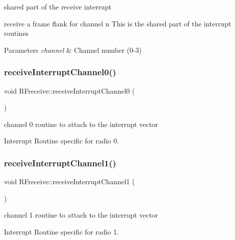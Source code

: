 shared part of the receive interrupt 

receive a frame flank for channel n This is the shared part of the interrupt routines 
\begin{DoxyParams}{Parameters}
{\em channel} & Channel number (0-\/3) \\
\hline
\end{DoxyParams}
\mbox{\label{class_r_freceive_a1f1c4ecbbafe17d4bebe3faedd9a6450}} 
\subsubsection{\texorpdfstring{receive\+Interrupt\+Channel0()}{receiveInterruptChannel0()}}
{\footnotesize\ttfamily void R\+Freceive\+::receive\+Interrupt\+Channel0 (\begin{DoxyParamCaption}{ }\end{DoxyParamCaption})\hspace{0.3cm}{\ttfamily [static]}}



channel 0 routine to attach to the interrupt vector 

Interrupt Routine specific for radio 0. \mbox{\label{class_r_freceive_aeb586b7bb9cb2c30ea4fa2b70e4e4a61}} 
\subsubsection{\texorpdfstring{receive\+Interrupt\+Channel1()}{receiveInterruptChannel1()}}
{\footnotesize\ttfamily void R\+Freceive\+::receive\+Interrupt\+Channel1 (\begin{DoxyParamCaption}{ }\end{DoxyParamCaption})\hspace{0.3cm}{\ttfamily [static]}}



channel 1 routine to attach to the interrupt vector 

Interrupt Routine specific for radio 1. \mbox{\label{class_r_freceive_a630b264c2715e88e950671b5e60fb283}} 
